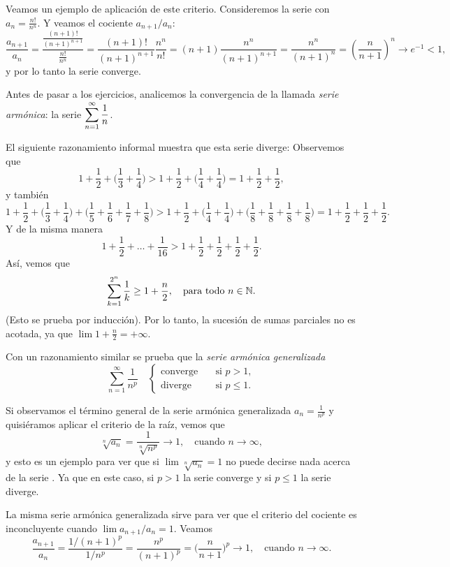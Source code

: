 Veamos un ejemplo de aplicación de este criterio.
Consideremos la serie \seriean con $a_n = \frac{n!}{n^n}$. Y veamos el cociente $a_{n+1}/a_n$:
\[
\frac{a_{n+1}}{a_n} 
= \frac{\frac{(n+1)!}{(n+1)^{n+1}}}{\frac{n!}{n^{n}}}
= \frac{(n+1)!}{(n+1)^{n+1}} \frac{n^{n}}{n!}
= (n+1) \frac{n^{n}}{(n+1)^{n+1}} 
= \frac{n^{n}}{(n+1)^n} 
= \left(\frac{n}{n+1}\right)^n \to e^{-1} < 1,
\]
y por lo tanto la serie \seriean converge.

Antes de pasar a los ejercicios, analicemos la convergencia de la llamada \emph{serie armónica}: la serie $\displaystyle \sum_{n=1}^\infty \frac1n$.

El siguiente razonamiento informal muestra que esta serie diverge:
Observemos que
\[
1+\frac12 + \Big(\frac13 + \frac 14\Big)
> 
1+\frac12 + \Big(\frac14 + \frac 14\Big)
= 1 + \frac12 + \frac12,
\]
y también 
\[
1+\frac12 + \Big(\frac13 + \frac 14\Big) + \Big( \frac15 + \frac16 + \frac17 + \frac18 \Big)
> 
1+\frac12 + \Big(\frac14 + \frac 14\Big) + \Big( \frac18 + \frac18 + \frac18 + \frac18 \Big) 
= 1 + \frac12 + \frac12 + \frac12.
\]
Y de la misma manera
\[
1+\frac12 + \dots + \frac1{16} > 
 1 + \frac12 + \frac12 + \frac12 + \frac12.
\]
Así, vemos que 
\[
\sum_{k=1}^{2^n} \frac1k \ge 1 + \frac n2, \quad\text{para todo {\ensuremath{n\in\mathbb{N}}}}.
\]
(Esto se prueba por inducción).
Por lo tanto, la sucesión de sumas parciales no es acotada, ya que $\lim 1 + \frac n 2 = +\infty$.

Con un razonamiento similar se prueba que la \emph{serie armónica generalizada}
\[
\sum_{n=1}^\infty \frac{1}{n^p} \quad
\begin{cases} 
\text{converge} \quad&\text{si $p>1$},\\
\text{diverge} \quad&\text{si $p\le1$}.
\end{cases}
\]

Si observamos el término general de la serie armónica generalizada $a_n = \frac{1}{n^p}$
y quisiéramos aplicar el criterio de la raíz, vemos que 
\[
\sqrt[n]{a_n} = \frac{1}{\sqrt[n]{n^p}} \to 1, \quad\text{cuando $n\to\infty$},
\]
y esto es un ejemplo para ver que si $\lim \sqrt[n]{a_n} = 1$ no puede decirse nada acerca de la serie \seriean. Ya que en este caso, si $p>1$ la serie converge y si $p\le 1$ la serie diverge.

La misma serie armónica generalizada sirve para ver que el criterio del cociente es inconcluyente cuando $\lim a_{n+1}/a_n = 1$. Veamos
\[
\frac{a_{n+1}}{a_n} = \frac{1/(n+1)^p}{1/n^p} = \frac{n^p}{(n+1)^p}
= \Big( \frac{n}{n+1} \Big)^p \to 1, \quad\text{cuando $n\to\infty$}.
\]

